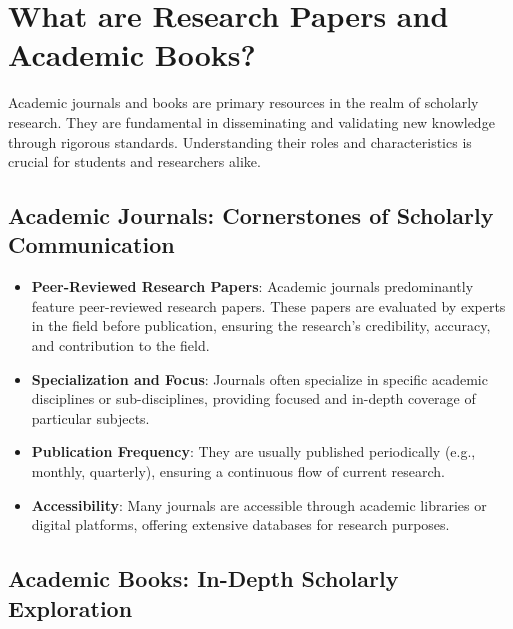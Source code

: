 \documentclass[
]{book}
\begin{document}
\hypertarget{what-are-research-papers-and-academic-books}{%
\section*{What are Research Papers and Academic Books?}\label{what-are-research-papers-and-academic-books}}

Academic journals and books are primary resources in the realm of scholarly research. They are fundamental in disseminating and validating new knowledge through rigorous standards. Understanding their roles and characteristics is crucial for students and researchers alike.

\hypertarget{academic-journals-cornerstones-of-scholarly-communication}{%
\subsection*{Academic Journals: Cornerstones of Scholarly Communication}\label{academic-journals-cornerstones-of-scholarly-communication}}

\begin{itemize}
\item
  \textbf{Peer-Reviewed Research Papers}: Academic journals predominantly feature peer-reviewed research papers. These papers are evaluated by experts in the field before publication, ensuring the research's credibility, accuracy, and contribution to the field.
\item
  \textbf{Specialization and Focus}: Journals often specialize in specific academic disciplines or sub-disciplines, providing focused and in-depth coverage of particular subjects.
\item
  \textbf{Publication Frequency}: They are usually published periodically (e.g., monthly, quarterly), ensuring a continuous flow of current research.
\item
  \textbf{Accessibility}: Many journals are accessible through academic libraries or digital platforms, offering extensive databases for research purposes.
\end{itemize}

\hypertarget{academic-books-in-depth-scholarly-exploration}{%
\subsection*{Academic Books: In-Depth Scholarly Exploration}\label{academic-books-in-depth-scholarly-exploration}}
\end{document}

